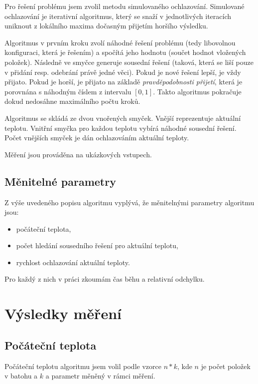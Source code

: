 \documentclass[czech]{article}
\begin{document}
Pro řešení problému jsem zvolil metodu simulovaného ochlazování.
Simulované ochlazování je iterativní algoritmus, který se snaží v jednotlivých iteracích uniknout z lokálního maxima dočasným přijetím horšího výsledku.

Algoritmus v prvním kroku zvolí náhodné řešení problému (tedy libovolnou konfiguraci, která je řešením) a spočítá jeho hodnotu (součet hodnot vložených položek).
Následně ve smyčce generuje sousední řešení (taková, která se liší pouze v přidání resp. odebrání právě jedné věci).
Pokud je nové řešení lepší, je vždy přijato.
Pokud je horší, je přijato na základě \textit{pravděpodobnosti přijetí}, která je porovnána s náhodným číslem z intervalu $[0, 1]$.
Takto algoritmus pokračuje dokud nedosáhne maximálního počtu kroků.

Algoritmus se skládá ze dvou vnořených smyček.
Vnější reprezentuje aktuální teplotu.
Vnitřní smyčka pro každou teplotu vybírá náhodné sousední řešení.
Počet vnějších smyček je dán ochlazováním aktuální teploty.

Měření jsou prováděna na ukázkových vstupech.

\subsection*{Měnitelné parametry}

Z výše uvedeného popisu algoritmu vyplývá, že měnitelnými parametry algoritmu jsou:

\begin{itemize}
    \item počáteční teplota,
    \item počet hledání sousedního řešení pro aktuální teplotu,
    \item rychlost ochlazování aktuální teploty.
\end{itemize}

Pro každý z nich v práci zkoumám čas běhu a relativní odchylku.

\section{Výsledky měření}

\subsection{Počáteční teplota}

Počáteční teplotu algoritmu jsem volil podle vzorce $n*k$, kde $n$ je počet položek v batohu a $k$ a parametr měněný v rámci měření.
\end{document}
